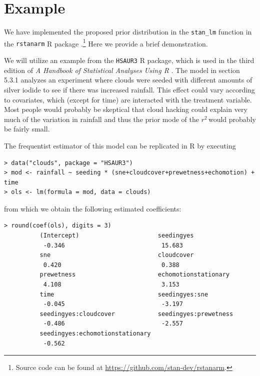 \documentclass[11pt]{article}
\newcommand{\Rsq}{$r^2\,$}
\begin{document}
\section{Example}


We have implemented the proposed prior distribution in the {\tt stan\_lm}
function in the {\tt rstanarm} R package \cite{rstanarm}.\footnote{Source
code can be found at \url{https://github.com/stan-dev/rstanarm}.}
Here we provide a brief demonstration.

We will utilize an example from the {\tt HSAUR3} R package, which is used in the
third edition of \emph{A Handbook of Statistical Analyses Using R}
\cite{HSAUR3-book}. The model in section 5.3.1 analyzes an experiment where
clouds were seeded with different amounts of silver iodide to see if there was
increased rainfall. This effect could vary according to covariates, which
(except for time) are interacted with the treatment variable. Most people would
probably be skeptical that cloud hacking could explain very much of the
variation in rainfall and thus the prior mode of the \Rsq would probably be
fairly small.

The frequentist estimator of this model can be replicated in R by executing

\vspace{.5cm}
\begin{lstlisting}[frame=lines]
> data("clouds", package = "HSAUR3")
> mod <- rainfall ~ seeding * (sne+cloudcover+prewetness+echomotion) + time
> ols <- lm(formula = mod, data = clouds)
\end{lstlisting}
\vspace{.5cm}

\noindent from which we obtain the following estimated coefficients:

\vspace{.5cm}
\begin{lstlisting}[frame=lines]
> round(coef(ols), digits = 3)
          (Intercept)                      seedingyes
           -0.346                           15.683
          sne                              cloudcover
           0.420                            0.388
          prewetness                       echomotionstationary
           4.108                            3.153
          time                             seedingyes:sne
           -0.045                           -3.197
          seedingyes:cloudcover            seedingyes:prewetness
           -0.486                           -2.557
          seedingyes:echomotionstationary
           -0.562
\end{lstlisting}
\vspace{.5cm}
\end{document}
